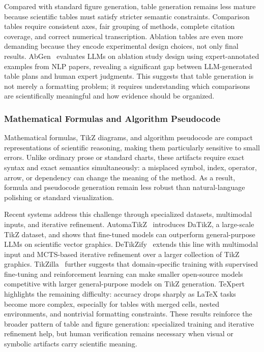 Compared with standard figure generation, table generation remains less mature because scientific tables must satisfy stricter semantic constraints. Comparison tables require consistent axes, fair grouping of methods, complete citation coverage, and correct numerical transcription. Ablation tables are even more demanding because they encode experimental design choices, not only final results. AbGen~\cite{abgen2025} evaluates LLMs on ablation study design using expert-annotated examples from NLP papers, revealing a significant gap between LLM-generated table plans and human expert judgments. This suggests that table generation is not merely a formatting problem; it requires understanding which comparisons are scientifically meaningful and how evidence should be organized.



\subsubsection{Mathematical Formulas and Algorithm Pseudocode}
\label{sec:formula_gen}

Mathematical formulas, TikZ diagrams, and algorithm pseudocode are compact representations of scientific reasoning, making them particularly sensitive to small errors. Unlike ordinary prose or standard charts, these artifacts require exact syntax and exact semantics simultaneously: a misplaced symbol, index, operator, arrow, or dependency can change the meaning of the method. As a result, formula and pseudocode generation remain less robust than natural-language polishing or standard visualization.

Recent systems address this challenge through specialized datasets, multimodal inputs, and iterative refinement. AutomaTikZ~\cite{belouadi2024automatikz} introduces DaTikZ, a large-scale TikZ dataset, and shows that fine-tuned models can outperform general-purpose LLMs on scientific vector graphics. DeTikZify~\cite{belouadi2024detikzify} extends this line with multimodal input and MCTS-based iterative refinement over a larger collection of TikZ graphics. TikZilla~\cite{tikzilla2026} further suggests that domain-specific training with supervised fine-tuning and reinforcement learning can make smaller open-source models competitive with larger general-purpose models on TikZ generation. TeXpert~\cite{texpert2025} highlights the remaining difficulty: accuracy drops sharply as LaTeX tasks become more complex, especially for tables with merged cells, nested environments, and nontrivial formatting constraints. These results reinforce the broader pattern of table and figure generation: specialized training and iterative refinement help, but human verification remains necessary when visual or symbolic artifacts carry scientific meaning.



